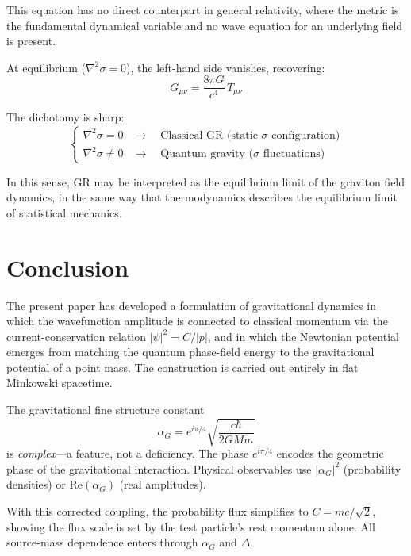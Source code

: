 \documentclass[11pt,a4paper]{article}
\theoremstyle{definition}
\theoremstyle{remark}
\begin{document}
	This equation has no direct counterpart in general relativity, where the metric is the fundamental dynamical variable and no wave equation for an underlying field is present.
	
	At equilibrium ($\nabla^2\sigma = 0$), the left-hand side vanishes, recovering:
	\begin{equation}
		\boxed{G_{\mu\nu} = \frac{8\pi G}{c^4}\,T_{\mu\nu}}
	\end{equation}
	
	The dichotomy is sharp:
	\begin{equation}
		\begin{cases}
			\nabla^2\sigma = 0 &\longrightarrow\quad\text{Classical GR (static $\sigma$ configuration)} \\[4pt]
			\nabla^2\sigma \neq 0 &\longrightarrow\quad\text{Quantum gravity ($\sigma$ fluctuations)}
		\end{cases}
	\end{equation}
	
	In this sense, GR may be interpreted as the equilibrium limit of the graviton field dynamics, in the same way that thermodynamics describes the equilibrium limit of statistical mechanics.

	\section{Conclusion}
	
	The present paper has developed a formulation of gravitational dynamics in which the wavefunction amplitude is connected to classical momentum via the current-conservation relation $|\psi|^2=C/|p|$, and in which the Newtonian potential emerges from matching the quantum phase-field energy to the gravitational potential of a point mass.  The construction is carried out entirely in flat Minkowski spacetime.
	
	The gravitational fine structure constant
	\begin{equation*}
		\alpha_G = e^{i\pi/4}\sqrt{\frac{c\hbar}{2GMm}}
	\end{equation*}
	is \emph{complex}---a feature, not a deficiency.  The phase $e^{i\pi/4}$ encodes the geometric phase of the gravitational interaction.  Physical observables use $|\alpha_G|^2$ (probability densities) or $\mathrm{Re}(\alpha_G)$ (real amplitudes).
	
	With this corrected coupling, the probability flux simplifies to $C=mc/\sqrt{2}$, showing the flux scale is set by the test particle's rest momentum alone.  All source-mass dependence enters through $\alpha_G$ and $\Delta$.
	
\end{document}
